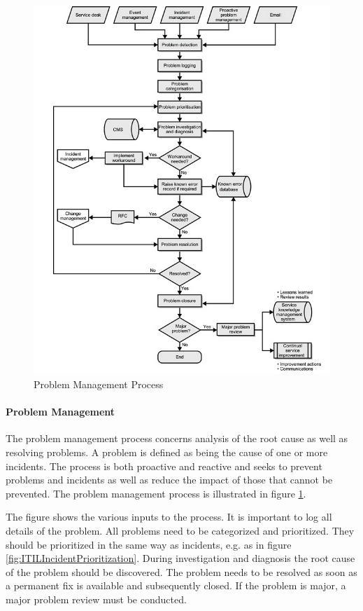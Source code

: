 \begin{figure}[H]
\hspace{-1cm}\includegraphics[scale=0.68]{ITILProblemManagement.png}
\caption[The ITIL Problem Management Process]{Problem Management Process \cite{itilbok}}
\label{fig:ITILProblemManagement}
\end{figure}

\paragraph{Problem Management}
The problem management process concerns analysis of the root cause as well as resolving problems. A problem is defined as being the cause of one or more incidents. The process is both proactive and reactive and seeks to prevent problems and incidents as well as reduce the impact of those that cannot be prevented. The problem management process is illustrated in figure \ref{fig:ITILProblemManagement}. 

The figure shows the various inputs to the process. It is important to log all details of the problem. All problems need to be categorized and prioritized. They should be prioritized in the same way as incidents, e.g. as in figure \ref{fig:ITILIncidentPrioritization}. During investigation and diagnosis the root cause of the problem should be discovered. The problem needs to be resolved as soon as a permanent fix is available and subsequently closed. If the problem is major, a major problem review must be conducted.

